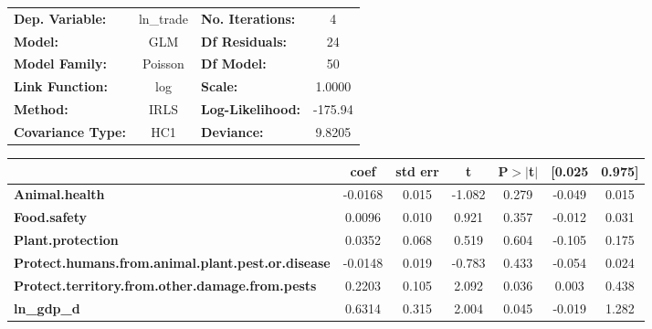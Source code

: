 \begin{center}
\begin{tabular}{lclc}
\toprule
\textbf{Dep. Variable:}                                   &   ln\_trade   & \textbf{  No. Iterations:    } &     4       \\
\textbf{Model:}                                           &      GLM      & \textbf{  Df Residuals:      } &     24      \\
\textbf{Model Family:}                                    &    Poisson    & \textbf{  Df Model:          } &     50      \\
\textbf{Link Function:}                                   &      log      & \textbf{  Scale:             } &    1.0000   \\
\textbf{Method:}                                          &      IRLS     & \textbf{  Log-Likelihood:    } &   -175.94   \\
\textbf{Covariance Type:}                                 &      HC1      & \textbf{  Deviance:          } &    9.8205   \\
\bottomrule
\end{tabular}
\begin{tabular}{lcccccc}
                                                          & \textbf{coef} & \textbf{std err} & \textbf{t} & \textbf{P$> |$t$|$} & \textbf{[0.025} & \textbf{0.975]}  \\
\midrule
\textbf{Animal.health}                                    &      -0.0168  &        0.015     &    -1.082  &         0.279        &       -0.049    &        0.015     \\
\textbf{Food.safety}                                      &       0.0096  &        0.010     &     0.921  &         0.357        &       -0.012    &        0.031     \\
\textbf{Plant.protection}                                 &       0.0352  &        0.068     &     0.519  &         0.604        &       -0.105    &        0.175     \\
\textbf{Protect.humans.from.animal.plant.pest.or.disease} &      -0.0148  &        0.019     &    -0.783  &         0.433        &       -0.054    &        0.024     \\
\textbf{Protect.territory.from.other.damage.from.pests}   &       0.2203  &        0.105     &     2.092  &         0.036        &        0.003    &        0.438     \\
\textbf{ln\_gdp\_d}                                       &       0.6314  &        0.315     &     2.004  &         0.045        &       -0.019    &        1.282     \\

\end{tabular}
\end{center}

